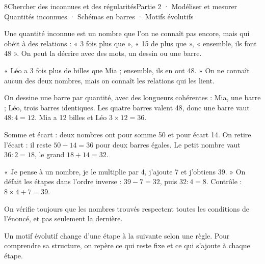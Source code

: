 \begin{ouverture}[suites]{8}{Chercher des inconnues et des régularités}{Partie 2 · Modéliser et mesurer}
{Quantités inconnues · Schémas en barres · Motifs évolutifs}
\end{ouverture}
\pagestyle{otMain}\essentiel\fontsize{11}{15}\selectfont
{}\label{cours-8-1}
\begin{definition}Une quantité inconnue est un nombre que l’on ne connaît pas encore, mais qui obéit à des relations : « 3 fois plus que », « 15 de plus que », « ensemble, ils font 48 ». On peut la décrire avec des mots, un dessin ou une barre.\end{definition}
\begin{exemple}« Léo a 3 fois plus de billes que Mia ; ensemble, ils en ont 48. » On ne connaît aucun des deux nombres, mais on connaît les relations qui les lient.\end{exemple}
\begin{savoirfaire}On dessine une barre par quantité, avec des longueurs cohérentes : Mia, une barre ; Léo, trois barres identiques. Les quatre barres valent 48, donc une barre vaut $48:4=12$. Mia a 12 billes et Léo $3\times12=36$.\end{savoirfaire}
\label{fig-cours-8-1-cours-barres}

\begin{propriete}Somme et écart : deux nombres ont pour somme 50 et pour écart 14. On retire l’écart : il reste $50-14=36$ pour deux barres égales. Le petit nombre vaut $36:2=18$, le grand $18+14=32$.\end{propriete}
\clearpage
{}\label{cours-8-2}
\begin{savoirfaire}« Je pense à un nombre, je le multiplie par 4, j’ajoute 7 et j’obtiens 39. » On défait les étapes dans l’ordre inverse : $39-7=32$, puis $32:4=8$. Contrôle : $8\times4+7=39$.\end{savoirfaire}
\begin{attention}On vérifie toujours que les nombres trouvés respectent toutes les conditions de l’énoncé, et pas seulement la dernière.\end{attention}
\begin{definition}Un motif évolutif change d’une étape à la suivante selon une règle. Pour comprendre sa structure, on repère ce qui reste fixe et ce qui s’ajoute à chaque étape.\end{definition}
\label{fig-cours-8-2-cours-motif}

